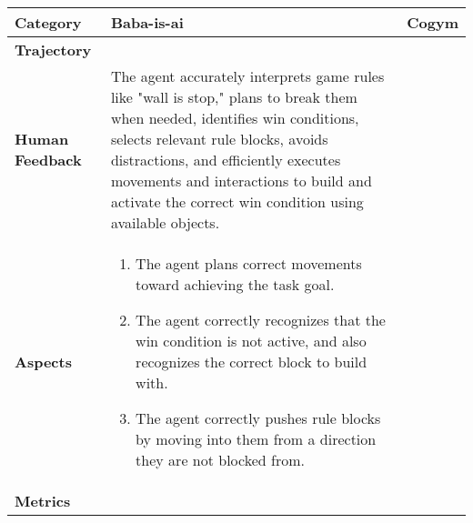 \documentclass{article}
\begin{document}
\begin{table}[!t]
    \centering
    \small
    \begin{tabular}{p{1.5cm}p{4cm}p{4cm}}
        \toprule
        Category & \textbf{Baba-is-ai}  & \textbf{Cogym} \\ %
        \midrule
        \textbf{Trajectory} & & \\ 
        \textbf{Human Feedback} & %
        The agent accurately interprets game rules like "wall is stop," plans to break them when needed, identifies win conditions, selects relevant rule blocks, avoids distractions, and efficiently executes movements and interactions to build and activate the correct win condition using available objects. & \\
        \textbf{Aspects} &         
        \begin{enumerate}[left=0pt]
          \item The agent plans correct movements toward achieving the task goal.
          \item The agent correctly recognizes that the win condition is not active, and also recognizes the correct block to build with.
          \item The agent correctly pushes rule blocks by moving into them from a direction they are not blocked from.
        \end{enumerate} & \\
        \textbf{Metrics}    &
        

\end{tabular}
\end{table}
\end{document}
